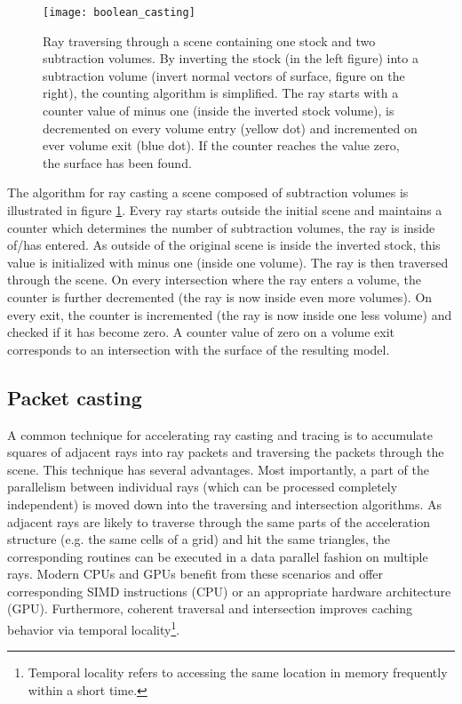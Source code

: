 \begin{figure}
\centering
\texttt{[image: boolean\_casting]}
\caption{Ray traversing through a scene containing one stock and two subtraction volumes. By inverting the stock (in the left figure) into a subtraction volume (invert normal vectors of surface, figure on the right), the counting algorithm is simplified. The ray starts with a counter value of minus one (inside the inverted stock volume), is decremented on every volume entry (yellow dot) and incremented on ever volume exit (blue dot). If the counter reaches the value zero, the surface has been found.}
\label{fig:boolean_casting} 
\end{figure}

The algorithm for ray casting a scene composed of subtraction volumes is illustrated in figure \ref{fig:boolean_casting}. Every ray starts outside the initial scene and maintains a counter which determines the number of subtraction volumes, the ray is inside of/has entered. As outside of the original scene is inside the inverted stock, this value is initialized with minus one (inside one volume). The ray is then traversed through the scene. On every intersection where the ray enters a volume, the counter is further decremented (the ray is now inside even more volumes). On every exit, the counter is incremented (the ray is now inside one less volume) and checked if it has become zero. A counter value of zero on a volume exit corresponds to an intersection with the surface of the resulting model.

\subsection{Packet casting}

A common technique for accelerating ray casting and tracing is to accumulate squares of adjacent rays into ray packets and traversing the packets through the scene. This technique has several advantages. Most importantly, a part of the parallelism between individual rays (which can be processed completely independent) is moved down into the traversing and intersection algorithms. As adjacent rays are likely to traverse through the same parts of the acceleration structure (e.g. the same cells of a grid) and hit the same triangles, the corresponding routines can be executed in a data parallel fashion on multiple rays. Modern CPUs and GPUs benefit from these scenarios and offer corresponding SIMD instructions (CPU) or an appropriate hardware architecture (GPU). Furthermore, coherent traversal and intersection improves caching behavior via temporal locality\footnote{Temporal locality refers to accessing the same location in memory frequently within a short time.}.


